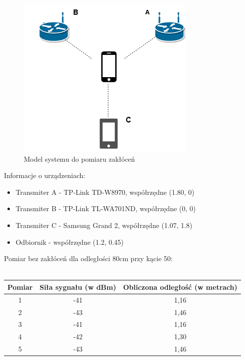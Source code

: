 \begin{figure}				
	\centering
	\caption{Model systemu do pomiaru zakłóceń}
	\includegraphics{inz2}
\end{figure}
Informacje o urządzeniach:
\begin{itemize}
	\item Transmiter A - TP-Link TD-W8970, współrzędne (1.80, 0)
	\item Transmiter B - TP-Link TL-WA701ND, współrzędne (0, 0)
	\item Transmiter C - Samsung Grand 2, współrzędne (1.07, 1.8)
	\item Odbiornik - współrzędne (1.2, 0.45)
\end{itemize}
\begin{center}
	\begin{minipage}{\linewidth}
		Pomiar bez zakłóceń dla odległości 80cm przy kącie 50\textdegree :\\\\
		\begin{tabular}{|c|c|c|}
			\hline 
			Pomiar & Siła sygnału (w dBm) & Obliczona odległość (w metrach) \\ 
			\hline 
			1 & -41 & 1,16 \\ 
			\hline 
			2 & -43 & 1,46 \\ 
			\hline 
			3 & -41 & 1,16 \\ 
			\hline 
			4 & -42 & 1,30 \\ 
			\hline 
			5 & -43 & 1,46 \\ 
			\hline 
		\end{tabular}
	\end{minipage} 
\end{center}
